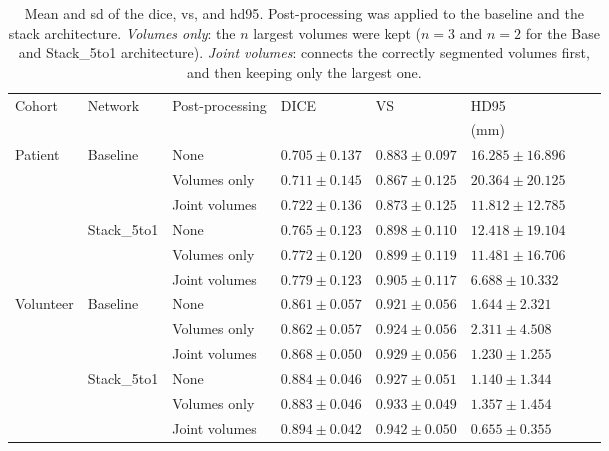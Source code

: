 \begin{table}[htbp]
   \centering
   \caption[Results for Post-processing]{Mean and \gls{sd} of the \acrlong{dice}, \acrlong{vs}, and \acrlong{hd95}. Post-processing was applied to the baseline and the stack architecture. \textit{Volumes only}: the $n$ largest volumes were kept ($n = 3$ and $n = 2$ for the Base and Stack\_5to1 architecture). \textit{Joint volumes}: connects the correctly segmented volumes first, and then keeping only the largest one.}
   \begin{tabular}{l*{7}{l}}
      \toprule
      Cohort	& Network	& Post-processing	& DICE				& VS				& HD95\\
      			&					&					&					&					& (mm)\\
      \midrule
      Patient   & Baseline 	& None & $0.705 \pm 0.137$ & $\mathbf{0.883 \pm 0.097}$ & $16.285 \pm 16.896$\\
                &                	& Volumes only  & $0.711 \pm 0.145$ & $0.867 \pm 0.125$ & $20.364 \pm 20.125$\\
                &                	& Joint volumes & $\mathbf{0.722 \pm 0.136}$ & $0.873 \pm 0.125$ & $\mathbf{11.812 \pm 12.785}$\\
      \cmidrule{2-6}
                & Stack\_5to1 	& None & $0.765 \pm 0.123$ & $0.898 \pm 0.110$ & $12.418 \pm 19.104$\\
                &                	& Volumes only  & $0.772 \pm 0.120$ & $0.899 \pm 0.119$ & $11.481 \pm 16.706$\\
                &                	& Joint volumes      & $\mathbf{0.779 \pm 0.123}$ & $\mathbf{0.905 \pm 0.117}$ & $\mathbf{6.688  \pm 10.332}$\\
      \midrule
      Volunteer & Baseline 	& None & $0.861 \pm 0.057$ & $0.921 \pm 0.056$ & $1.644  \pm 2.321 $\\
                &                	& Volumes only  & $0.862 \pm 0.057$ & $0.924 \pm 0.056$ & $2.311  \pm 4.508 $\\
                &                	& Joint volumes      & $\mathbf{0.868 \pm 0.050}$ & $\mathbf{0.929 \pm 0.056}$ & $\mathbf{1.230  \pm 1.255}$\\
      \cmidrule{2-6}
                & Stack\_5to1 	& None & $0.884 \pm 0.046$ & $0.927 \pm 0.051$ & $1.140  \pm 1.344 $\\
                &                	& Volumes only  & $0.883 \pm 0.046$ & $0.933 \pm 0.049$ & $1.357  \pm 1.454 $\\
                &                	& Joint volumes      & $\mathbf{0.894 \pm 0.042}$ & $\mathbf{0.942 \pm 0.050}$ & $\mathbf{0.655  \pm 0.355}$\\
      \bottomrule
   \end{tabular}
   \label{tab:results_pp_small}
\end{table}

